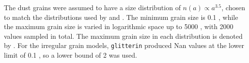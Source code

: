 The dust grains were assumed to have a size distribution of $n(a)\propto a^{3.5}$, chosen to match the distributions used by \cite{Kataoka_2015} and \cite{Zhang2023}. The minimum grain size is 0.1 \micronNS, while the maximum grain size is varied in logarithmic space up to 5000 \micronNS, with 2000 values sampled in total. The maximum grain size in each distribution is denoted by \amaxNS. For the irregular grain models, \texttt{glitterin} produced Nan values at the lower limit of 0.1 \micronNS, so a lower bound of 2 \micron was used. 




